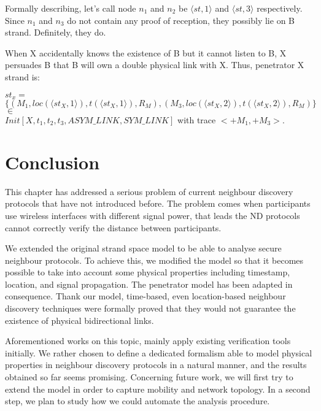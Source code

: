Formally describing, let's call node $n_1$ and $n_2$ be $\langle st, 1 \rangle$ and $\langle st, 3 \rangle$ respectively. Since $n_1$ and $n_3$ do not contain any proof of reception, they possibly lie on B strand. Definitely, they do. 

When X accidentally knows the existence of B but it cannot listen to B, X persuades B that B will own a double physical link with X. Thus, penetrator X strand is: 
\begin{center}
$st_x =$ $\{(M_1,loc(\langle st_X,1\rangle),t(\langle st_X,1\rangle), R_M),(M_3,loc(\langle st_X,2\rangle),t(\langle st_X,2\rangle), R_M)\}$ $\in$ \\
$Init[X,t_1,t_2,t_3,ASYM\_LINK,SYM\_LINK]$ with trace $<+M_1,+M_3>$.
\end{center}

\section{Conclusion}

This chapter has addressed a serious problem of current neighbour discovery protocols that have not introduced before. The problem comes when participants use wireless interfaces with different signal power, that leads the ND protocols cannot correctly verify the distance between participants.  

We extended the original strand space model to be able to analyse secure neighbour protocols. To achieve this, we modified the model so that it becomes possible to take into account some physical properties including timestamp, location, and signal propagation. The penetrator model has been adapted in consequence. Thank our model, time-based, even location-based neighbour discovery techniques were formally proved that they would not guarantee the existence of physical bidirectional links. 

Aforementioned works on this topic, mainly apply existing verification tools initially. We rather chosen to define a dedicated formalism able to model physical properties in neighbour discovery protocols in a natural manner, and the results obtained so far seems promising. Concerning future work, we will first try to extend the model in order to capture mobility and network topology. In a second step, we plan to study how we could automate the analysis procedure.
